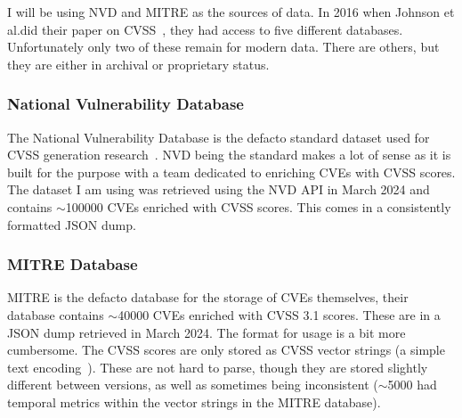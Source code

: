 \documentclass[12pt]{article}
\begin{document}
I will be using NVD and MITRE as the sources of data. In 2016 when Johnson et al.\@ did their paper
on CVSS~\cite{bayes}, they had access to five different databases. Unfortunately only two of these
remain for modern data. There are others, but they are either in archival or proprietary status.

\subsubsection{National Vulnerability Database} \label{NVD_SECTION}

The National Vulnerability Database is the defacto standard dataset used for CVSS generation
research~\cite{costa, nvd_example1, nvd_example2}.  NVD being the standard makes a lot of sense as it is built
for the purpose with a team dedicated to enriching CVEs with CVSS scores. The dataset I am using was
retrieved using the NVD API in March 2024 and contains $\sim$100000 CVEs enriched with CVSS scores. This
comes in a consistently formatted JSON dump.

\subsubsection{MITRE Database}  \label{MITRE_SECTION}

MITRE is the defacto database for the storage of CVEs themselves, their database contains $\sim$40000
CVEs enriched with CVSS 3.1 scores. These are in a JSON dump retrieved in March 2024. The
format for usage is a bit more cumbersome. The CVSS scores are only stored as CVSS vector
strings (a simple text encoding~\cite{vector_string}). These are not hard to parse, though they are stored slightly
different between versions, as well as sometimes being inconsistent ($\sim$5000 had temporal metrics within
the vector strings in the MITRE database).
\end{document}
